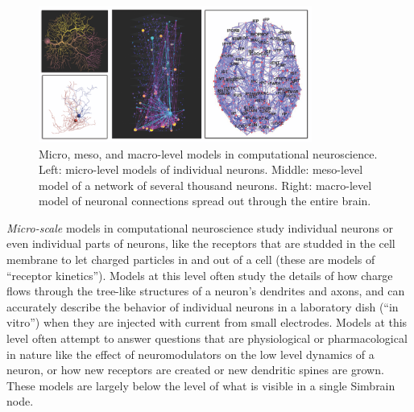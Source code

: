 \begin{figure}[h]
\centering
\includegraphics[width=0.8\textwidth]{./images/3typesmodels.png}
\caption[Layout by Pamela Payne. Top Left: ; Bottom Left: ; Middle: Screenshot by Zach Tosi ; Right: From Hagmann et al., 2008 \cite{hagmann2008mapping}, Licensed Under CC BY]{Micro, meso, and macro-level models in computational neuroscience. Left: micro-level models of individual neurons. Middle: meso-level model of a network of several thousand neurons. Right: macro-level model of neuronal connections spread out through the entire brain.}
\label{compNeuro}
\end{figure}

\emph{Micro-scale} models in computational neuroscience study individual neurons or even individual parts of neurons, like the receptors that are studded in the cell membrane to let charged particles in and out of a cell (these are models of ``receptor kinetics''). Models at this level often study the details of how charge flows through the tree-like structures of a neuron's dendrites and axons, and can accurately describe the behavior of individual neurons in a laboratory dish (``in vitro'') when they are injected with current from small electrodes. Models at this level often attempt to answer questions that are physiological or pharmacological in nature like the effect of neuromodulators on the low level dynamics of a neuron, or how new receptors are created or new dendritic spines are grown. These models are largely below the level of what is visible in a single Simbrain node.

